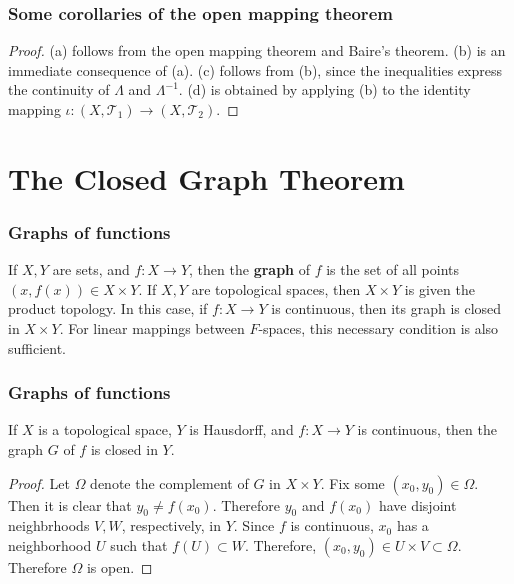\documentclass{beamer}
\begin{document}
\begin{frame}
\frametitle{Some corollaries of the open mapping theorem}
\begin{proof}
    (a) follows from the open mapping theorem and Baire's theorem. (b) is an immediate consequence of (a). (c) follows from (b), since the inequalities express the continuity of $\Lambda$ and $\Lambda^{-1}$. (d) is obtained by applying (b) to the identity mapping $\iota : (X,\mathcal{T}_1) \to (X,\mathcal{T}_2)$. 
\end{proof}
\end{frame}

\section{The Closed Graph Theorem}
\begin{frame}
\frametitle{Graphs of functions}
\begin{definition}
    If $X,Y$ are sets, and $f: X \to Y$, then the \textbf{graph} of $f$ is the set of all points $(x,f(x)) \in X\times Y$. If $X,Y$ are topological spaces, then $X \times Y$ is given the product topology. In this case, if $f : X \to Y$ is continuous, then its graph is closed in $X \times Y$. For linear mappings between $F$-spaces, this necessary condition is also sufficient.
\end{definition}
\end{frame}
\begin{frame}
\frametitle{Graphs of functions}
\begin{theorem}
    If $X$ is a topological space, $Y$ is Hausdorff, and $f: X \to Y$ is continuous, then the graph $G$ of $f$ is closed in $Y$.
\end{theorem}
\begin{proof}
    Let $\Omega$ denote the complement of $G$ in $X \times Y$. Fix some $(x_0,y_0)\in\Omega$. Then it is clear that $y_0 \neq f(x_0)$. Therefore $y_0$ and $f(x_0)$ have disjoint neighbrhoods $V,W$, respectively, in $Y$. Since $f$ is continuous, $x_0$ has a neighborhood $U$ such that $f(U)\subset W$. Therefore, $(x_0,y_0) \in U \times V \subset \Omega$. Therefore $\Omega$ is open.
\end{proof}
\end{frame}
\end{document}
